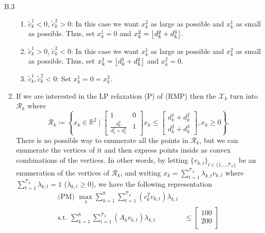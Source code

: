 \documentclass[a4paper]{article}
\DeclarePairedDelimiter\floor{\lfloor}{\rfloor}
\begin{document}
\begin{exercise}{B.3}
\begin{enumerate}[label=(\roman*)]
\begin{enumerate}[label=(\arabic*)]
          \item $ \tilde{c}_k^{1}< 0 $, $ \tilde{c}_k^2 > 0 $: In this case we want $ x_k^{2} $ as large as possible and $ x_k^{1} $ as small as possible. Thus, set $ x_k^{1} = 0 $ and $ x_k^{2} = \floor*{d_k^2 + d_k^3} $.
          \item $ \tilde{c}_k^{1}> 0 $, $ \tilde{c}_k^2 < 0 $: In this case we want $ x_k^{1} $ as large as possible and $ x_k^{2} $ as small as possible. Thus, set $ x_k^{1} = \floor*{d_k^{1} + d_k^2} $ and $ x_k^{2} = 0$.
          \item $ \tilde{c}_k^{1}, \tilde{c}_k^2 < 0 $: Set $ x_k^{1} = 0 = x_k^2 $.
        \end{enumerate}

      \item If we are interested in the LP relaxation (P) of (RMP) then the $ \mathscr{X}_k $ turn into $ \mathscr{R}_k $ where
        \begin{equation*}
          \mathscr{R}_k \coloneqq \left\{ x_k \in \mathbb{R}^2 \mid \begin{bmatrix}
              1 & 0 \\
              \frac{d_k^2}{d_k^1 + d_k^2} & 1
          \end{bmatrix}x_k \leq \begin{bmatrix}
              d_k^1 + d_k^2 \\
              d_k^{2} + d_k^{3}
          \end{bmatrix}, x_k \geq 0 \right\}
        .\end{equation*}
        There is no possible way to enumerate all the points in $ \mathscr{R}_k $, but we can enumerate the vertices of it and then express points inside as convex combinations of the vertices. In other words, by letting $ \{v_{k,t}\}_{t \in \{1, \ldots \mathcal{T}_k \}} $ be an enumeration of the vertices of $ \mathscr{R}_k $, and writing $ x_k = \sum_{t = 1}^{\mathcal{T}_k} \lambda_{k,t}v_{k,t} $ where $ \sum_{t = 1}^{\mathcal{T}_k} \lambda_{k,t} = 1 $ ($ \lambda_{k,t} \geq 0 $), we have the following representation
        \begin{align*}
          \text{(PM)  } \max_{\lambda} \sum_{k = 1}^{8} \sum_{t = 1}^{\mathcal{T}_k} (c_k^{T}v_{k,t})\lambda_{k,t}& \\
          \text{s.t. } \sum_{k = 1}^{8} \sum_{t = 1}^{\mathcal{T}_k} (A_k v_{k,t})\lambda_{k,t} &\leq \begin{bmatrix}
            100 \\
            200 \\

\end{bmatrix}
\end{align*}
\end{enumerate}
\end{exercise}
\end{document}
